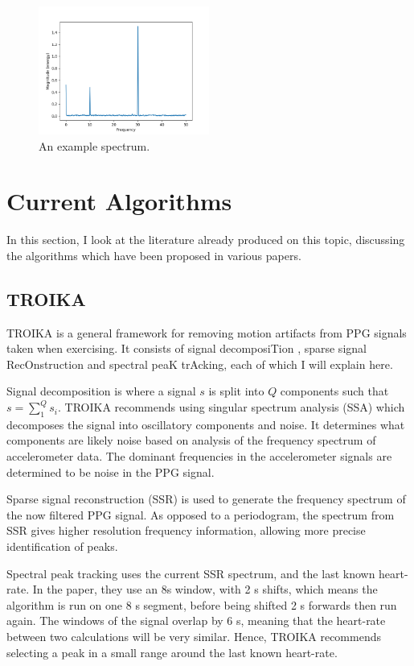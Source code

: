 \documentclass[12pt,a4paper,twoside,openright]{report}
\begin{document}
\begin{figure}[h]
	\centering
	\includegraphics[width=0.5\textwidth]{figs/example-spectrum.png}
	\caption{An example spectrum.}
	\label{fig:example-spectrum}
\end{figure}



\section{Current Algorithms}

In this section, I look at the literature already produced on this topic,
discussing the algorithms which have been proposed in various papers.

\subsection{TROIKA}

TROIKA \cite{Zhang15} is a general framework for removing motion artifacts
from PPG signals taken when exercising. It consists of signal decomposiTion
, sparse signal RecOnstruction and spectral peaK trAcking, each of which I will
explain here.

Signal decomposition is where a signal \(s\) is split into \(Q\) components
such that $s=\sum_1^Q s_i$. TROIKA recommends using singular spectrum analysis
(SSA) which decomposes the signal into oscillatory components and noise. It
determines what components are likely noise based on analysis of the frequency
spectrum of accelerometer data. The dominant frequencies in the accelerometer
signals are determined to be noise in the PPG signal.

Sparse signal reconstruction (SSR) is used to generate the frequency spectrum of the
now filtered PPG signal. As opposed to a periodogram, the spectrum from SSR
gives higher resolution frequency information, allowing more precise
identification of peaks.

Spectral peak tracking uses the current SSR spectrum, and the last known
heart-rate. In the paper, they use an 8s window, with 2 s shifts, which means
the algorithm is run on one 8 s segment, before being shifted 2 s forwards then
run again.
The windows of the signal overlap by 6 s, meaning that the heart-rate
between two calculations will be very similar. Hence, TROIKA recommends
selecting a peak in a small range around the last known heart-rate.
\end{document}
